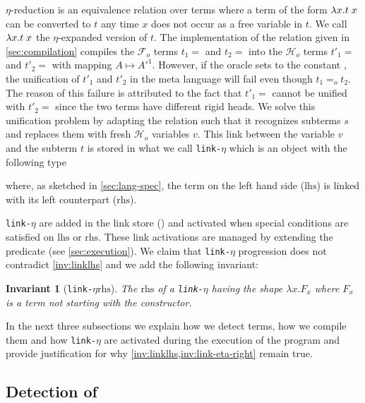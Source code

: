\documentclass[sigconf,natbib=false,review]{acmart}
\newtheorem{invariant}{Invariant}
\newcommand{\appsep}{\ensuremath{\textcolor{lightgray}{\cdot}}}
\newcommand{\EqualRel}{\ensuremath{=}}
\newcommand{\Eo}{\ensuremath{\EqualRel_o}\xspace}
\newcommand{\linketa}{\texttt{link-}\ensuremath{\eta}\xspace}
\newcommand{\Fo}{\ensuremath{\mathcal{F}_{\!o}\xspace}} %
\newcommand{\Ho}{\ensuremath{\mathcal{H}_o}\xspace}
\newcommand{\mapping}[3]{\ensuremath{#1 \mapsto #2^#3}}
\newcommand{\lhs}{\ensuremath{\mathrm{lhs}}\xspace}
\newcommand{\rhs}{\ensuremath{\mathrm{rhs}}\xspace}
\begin{document}
$\eta$-reduction is an equivalence relation over terms where a term of the form
$\lambda x.t \appsep x$ can be converted to $t$ any time $x$ does not occur as a
free variable in $t$. We call $\lambda x. t \appsep x$ the $\eta$-expanded
version of $t$. The implementation of the  relation given in
\cref{sec:compilation} compiles the \Fo{} terms $t_1 = $ and $t_2 =$  into the \Ho terms $t'_1 =
$ and $t'_2 =$  with mapping
\mapping{A}{A'}{1}. However, if the oracle sets  to the constant
, the unification of $t'_1$ and $t'_2$ in the meta language will
fail even though $t_1 \Eo t_2$. The reason of this failure is attributed to the
fact that $t'_1 =$ cannot be unified with $t'_2
=$ since the two terms have different rigid heads. We solve this
unification problem by adapting the  relation such that it
recognizes \maybeeta subterms $s$ and replaces them with fresh \Ho variables
$v$. This link between the variable $v$ and the subterm $t$ is stored in what we
call \linketa which is an object with the following type


\noindent
where, as sketched in \cref{sec:lang-spec}, the term on the left hand side
(\lhs) is linked with its left counterpart (\rhs).

\linketa are added in the link store (\linkStore) and activated when special
conditions are satisfied on \lhs or \rhs. These link activations are managed by
extending the  predicate (see \cref{sec:execution}).
We claim that \linketa progression does not contradict \cref{inv:linklhs} and we
add the following invariant:

\begin{invariant}[\linketa \rhs]
  The \rhs of a \linketa having the shape $\lambda x.F_x$
  where $F_x$ is a term not starting with the  constructor.
  \label{inv:link-eta-right}
\end{invariant}

In the next three subsections we explain how we detect \maybeeta terms, how we
compile them and how \linketa are activated during the execution of the program
and provide justification for why \cref{inv:linklhs,inv:link-eta-right} remain true.

\subsection{Detection of \maybeeta}
\end{document}
